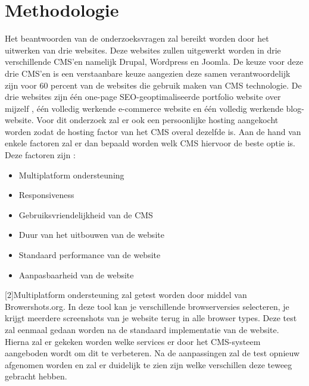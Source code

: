 


\section{Methodologie}
\label{sec:methodologie}

Het beantwoorden van de onderzoeksvragen zal bereikt worden door het uitwerken van drie websites. Deze websites zullen uitgewerkt worden in drie verschillende CMS'en namelijk Drupal, Wordpress en Joomla. De keuze voor deze drie CMS'en is een verstaanbare keuze aangezien deze samen verantwoordelijk zijn voor 60 percent van de websites die gebruik maken van CMS technologie\autocite{BWPL2017}. De drie websites zijn één one-page SEO-geoptimaliseerde portfolio website over mijzelf , één volledig werkende e-commerce website en één volledig werkende blog-website. Voor dit onderzoek zal er ook een persoonlijke hosting aangekocht worden zodat de hosting factor van het CMS overal dezelfde is. Aan de hand van enkele factoren zal er dan bepaald worden welk CMS hiervoor de beste optie is.
Deze factoren zijn :
\begin{itemize}
	\item Multiplatform ondersteuning
	\item Responsiveness
	\item Gebruiksvriendelijkheid van de CMS
	\item Duur van het uitbouwen van de website
	\item Standaard performance van de website
	\item Aanpasbaarheid van de website
\end{itemize}[2]Multiplatform ondersteuning zal getest worden door middel van Browershots.org. In deze tool kan je verschillende browserversies selecteren, je krijgt meerdere screenshots van je website terug in alle browser types. Deze test zal eenmaal gedaan worden na de standaard implementatie van de website. Hierna zal er gekeken worden welke services er door het CMS-systeem aangeboden wordt om dit te verbeteren. Na de aanpassingen zal de test opnieuw afgenomen worden en zal er duidelijk te zien zijn  welke verschillen deze teweeg gebracht hebben.

